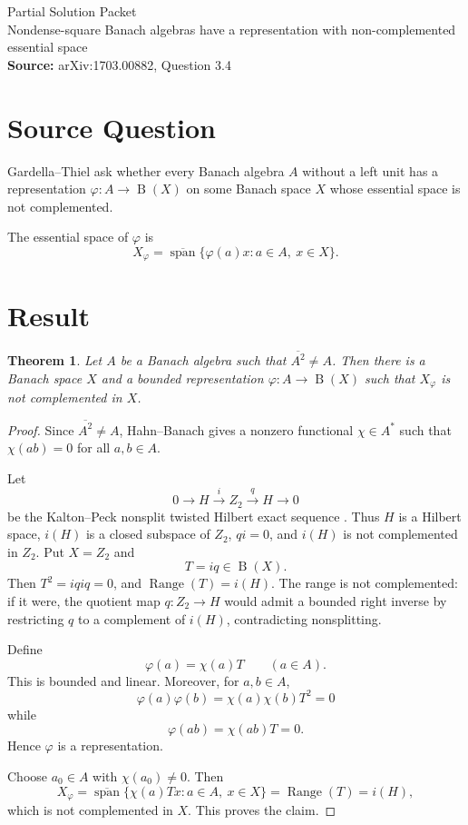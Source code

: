 \documentclass[11pt]{article}
\newtheorem*{theorem}{Theorem}
\DeclareMathOperator{\Range}{Range}
\DeclareMathOperator{\Bdd}{B}
\newcommand{\cl}{\overline}
\begin{document}
\begin{center}
{\Large Partial Solution Packet}\\[0.25em]
{\large Nondense-square Banach algebras have a representation with non-complemented essential space}\\[0.35em]
\textbf{Source:} arXiv:1703.00882, Question 3.4
\end{center}

\section*{Source Question}

Gardella--Thiel ask whether every Banach algebra \(A\) without a left unit has
a representation \(\varphi:A\to \Bdd(X)\) on some Banach space \(X\) whose
essential space is not complemented.

The essential space of \(\varphi\) is
\[
X_\varphi=\cl{\operatorname{span}}\{\varphi(a)x:a\in A,\ x\in X\}.
\]

\section*{Result}

\begin{theorem}
Let \(A\) be a Banach algebra such that \(\cl{A^2}\ne A\). Then there is a
Banach space \(X\) and a bounded representation \(\varphi:A\to\Bdd(X)\) such
that \(X_\varphi\) is not complemented in \(X\).
\end{theorem}

\begin{proof}
Since \(\cl{A^2}\ne A\), Hahn--Banach gives a nonzero functional
\(\chi\in A^*\) such that \(\chi(ab)=0\) for all \(a,b\in A\).

Let
\[
0\longrightarrow H \stackrel{i}{\longrightarrow} Z_2
\stackrel{q}{\longrightarrow} H\longrightarrow 0
\]
be the Kalton--Peck nonsplit twisted Hilbert exact sequence
\cite{KaltonPeck}. Thus \(H\) is a Hilbert space, \(i(H)\) is a closed subspace
of \(Z_2\), \(q i=0\), and \(i(H)\) is not complemented in \(Z_2\). Put
\(X=Z_2\) and
\[
T=i q\in \Bdd(X).
\]
Then \(T^2=i q i q=0\), and \(\Range(T)=i(H)\). The range is not complemented:
if it were, the quotient map \(q:Z_2\to H\) would admit a bounded right inverse
by restricting \(q\) to a complement of \(i(H)\), contradicting nonsplitting.

Define
\[
\varphi(a)=\chi(a)T\qquad(a\in A).
\]
This is bounded and linear. Moreover, for \(a,b\in A\),
\[
\varphi(a)\varphi(b)=\chi(a)\chi(b)T^2=0
\]
while
\[
\varphi(ab)=\chi(ab)T=0.
\]
Hence \(\varphi\) is a representation.

Choose \(a_0\in A\) with \(\chi(a_0)\ne0\). Then
\[
X_\varphi
=\cl{\operatorname{span}}\{\chi(a)T x:a\in A,\ x\in X\}
=\Range(T)
=i(H),
\]
which is not complemented in \(X\). This proves the claim.
\end{proof}
\end{document}
